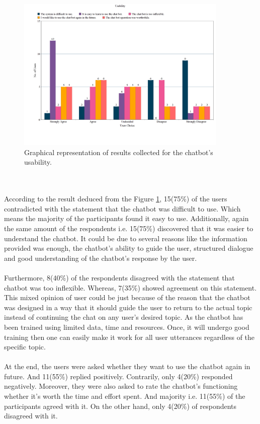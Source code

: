 \begin{figure}[!h]
    \centering
    \includegraphics[width=0.9\textwidth]{img/Usability_Updated.png}
    \caption{Graphical representation of results collected for the chatbot's usability.}
    \label{fig:usabil}
\end{figure}
\\~\\
According to the result deduced from the Figure \ref{fig:usabil}, 15(75\%) of the users contradicted with the statement that the chatbot was difficult to use. Which means the majority of the participants found it easy to use. Additionally, again the same amount of the respondents i.e. 15(75\%) discovered that it was easier to understand the chatbot. It could be due to several reasons like the information provided was enough, the chatbot's ability to guide the user, structured dialogue and good understanding of the chatbot's response by the user.
\\~\\
Furthermore, 8(40\%) of the respondents disagreed with the statement that chatbot was too inflexible. Whereas, 7(35\%) showed agreement on this statement. This mixed opinion of user could be just because of the reason that the chatbot was designed in a way that it should guide the user to return to the actual topic instead of continuing the chat on any user's desired topic. As the chatbot has been trained using limited data, time and resources. Once, it will undergo good training then one can easily make it work for all user utterances regardless of the specific topic.
\\~\\
At the end, the users were asked whether they want to use the chatbot again in future. And 11(55\%) replied positively. Contrarily, only 4(20\%) responded negatively. Moreover, they were also asked to rate the chatbot's functioning whether it's worth the time and effort spent. And majority i.e. 11(55\%) of the participants agreed with it. On the other hand, only 4(20\%) of respondents disagreed with it.

